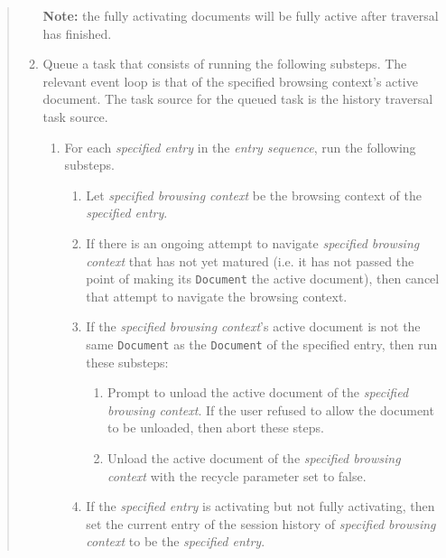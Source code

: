 \documentclass{notes}
\begin{document}
\begin{quote}
\begin{enumerate}
    \textbf{Note:} the fully activating documents
    will be fully active after traversal has finished.
    
  \item Queue a task that consists of running the following
    substeps. The relevant event loop is that of the specified
    browsing context's active document. The task source for the queued
    task is the history traversal task source.

    \begin{enumerate}

    \item For each \emph{specified entry} in the \emph{entry sequence},
      run the following substeps.
      \begin{enumerate}

      \item Let \emph{specified browsing context} be the browsing context of the \emph{specified entry}.

      \item If there is an ongoing attempt to navigate \emph{specified
        browsing context} that has not yet matured (i.e. it has not
        passed the point of making its \texttt{Document} the active
        document), then cancel that attempt to navigate the browsing
        context.

      \item If the \emph{specified browsing context}'s active document
        is not the same \texttt{Document} as the \texttt{Document} of
        the specified entry, then run these substeps:
        \begin{enumerate}
          
        \item Prompt to unload the active document of the
          \emph{specified browsing context}. If the user refused to
          allow the document to be unloaded, then abort these steps.

        \item Unload the active document of the \emph{specified
          browsing context} with the recycle parameter set to false.

        \end{enumerate}

      \item If the \emph{specified entry} is activating but not fully activating,
        then set the current entry of the session history of \emph{specified browsing context}
        to be the \emph{specified entry}.
        

\end{enumerate}
\end{enumerate}
\end{enumerate}
\end{quote}
\end{document}
